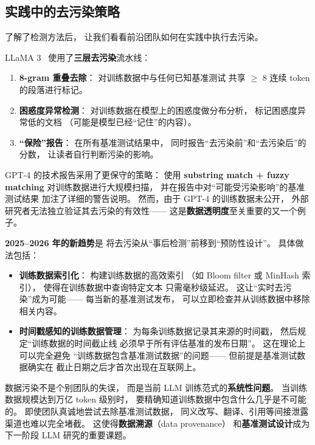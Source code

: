 \subsection{实践中的去污染策略}

了解了检测方法后，
让我们看看前沿团队如何在实践中执行去污染。

LLaMA 3~\cite{dubey2024llama3} 使用了\textbf{三层去污染}流水线：
\begin{enumerate}[noitemsep]
  \item \textbf{8-gram 重叠去除}：
        对训练数据中与任何已知基准测试
        共享 $\geq$ 8 连续 token 的段落进行标记。
  \item \textbf{困惑度异常检测}：
        对训练数据在模型上的困惑度做分布分析，
        标记困惑度异常低的文档
        （可能是模型已经``记住''的内容）。
  \item \textbf{``保险''报告}：
        在所有基准测试结果中，
        同时报告``去污染前''和``去污染后''的分数，
        让读者自行判断污染的影响。
\end{enumerate}

GPT-4 的技术报告采用了更保守的策略：
使用 \textbf{substring match + fuzzy matching}
对训练数据进行大规模扫描，
并在报告中对``可能受污染影响''的基准测试结果
加注了详细的警告说明。
然而，由于 GPT-4 的训练数据未公开，
外部研究者无法独立验证其去污染的有效性——
这是\textbf{数据透明度}至关重要的又一个例子。

\textbf{2025--2026 年的新趋势}是
将去污染从``事后检测''前移到``预防性设计''。
具体做法包括：
\begin{itemize}[noitemsep]
  \item \textbf{训练数据索引化}：
        构建训练数据的高效索引
        （如 Bloom filter 或 MinHash 索引），
        使得在训练数据中查询特定文本
        只需毫秒级延迟。
        这让``实时去污染''成为可能——
        每当新的基准测试发布，
        可以立即检查并从训练数据中移除相关内容。
  \item \textbf{时间戳感知的训练数据管理}：
        为每条训练数据记录其来源的时间戳，
        然后规定``训练数据的时间截止线
        必须早于所有评估基准的发布日期''。
        这在理论上可以完全避免
        ``训练数据包含基准测试数据''的问题——
        但前提是基准测试数据确实在
        截止日期之后才首次出现在互联网上。
\end{itemize}

\begin{warnbox}[数据污染是一个系统性问题]
数据污染不是个别团队的失误，
而是当前 LLM 训练范式的\textbf{系统性问题}。
当训练数据规模达到万亿 token 级别时，
要精确知道训练数据中包含什么几乎是不可能的。
即使团队真诚地尝试去除基准测试数据，
同义改写、翻译、引用等间接泄露渠道也难以完全堵截。
这使得\textbf{数据溯源}（data provenance）
和\textbf{基准测试设计}成为下一阶段 LLM 研究的重要课题。
\end{warnbox}

